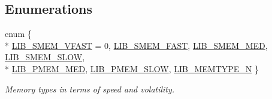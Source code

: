 \subsection*{Enumerations}
\begin{DoxyCompactItemize}
\item 
enum \{ \\*
\hyperlink{group__libarch__memmgt_gga06fc87d81c62e9abb8790b6e5713c55ba98a90dd78f7e0d087e7d9c66505011c7}{L\+I\+B\+\_\+\+S\+M\+E\+M\+\_\+\+V\+F\+A\+S\+T} = 0, 
\hyperlink{group__libarch__memmgt_gga06fc87d81c62e9abb8790b6e5713c55ba0554f0354c84251e347c0ee79ffe046d}{L\+I\+B\+\_\+\+S\+M\+E\+M\+\_\+\+F\+A\+S\+T}, 
\hyperlink{group__libarch__memmgt_gga06fc87d81c62e9abb8790b6e5713c55bab6e0c7570cd8f2ada826e36d607d8abb}{L\+I\+B\+\_\+\+S\+M\+E\+M\+\_\+\+M\+E\+D}, 
\hyperlink{group__libarch__memmgt_gga06fc87d81c62e9abb8790b6e5713c55badc4290cb2bdcc915f3156f39ce3ea361}{L\+I\+B\+\_\+\+S\+M\+E\+M\+\_\+\+S\+L\+O\+W}, 
\\*
\hyperlink{group__libarch__memmgt_gga06fc87d81c62e9abb8790b6e5713c55ba5e2798bb86ffcd081fbd1a7fad3571a2}{L\+I\+B\+\_\+\+P\+M\+E\+M\+\_\+\+M\+E\+D}, 
\hyperlink{group__libarch__memmgt_gga06fc87d81c62e9abb8790b6e5713c55ba106f7b37f3b11574158123d265359eeb}{L\+I\+B\+\_\+\+P\+M\+E\+M\+\_\+\+S\+L\+O\+W}, 
\hyperlink{group__libarch__memmgt_gga06fc87d81c62e9abb8790b6e5713c55ba1cb4f966271cb92f79ba8229136f3a70}{L\+I\+B\+\_\+\+M\+E\+M\+T\+Y\+P\+E\+\_\+\+N}
 \}
\begin{DoxyCompactList}\small\item\em Memory types in terms of speed and volatility. \end{DoxyCompactList}\end{DoxyCompactItemize}
